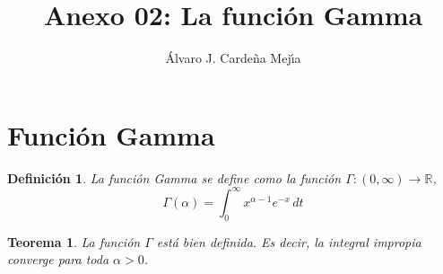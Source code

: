 \documentclass[a4paper,11pt]{article}
\title{Anexo 02: La funci\'on Gamma}
\author{\'Alvaro J. Carde\~na Mej\'{\i}a}
\theoremstyle{teoremas}
\newtheorem{teorema}{Teorema}[section]
\theoremstyle{ejemplos}
\theoremstyle{definiciones}
\theoremstyle{lemas}
\newtheorem*{definicion}{Definici\'on}
\begin{document}
\maketitle

\section{Funci\'on Gamma}

\begin{definicion}
 La \textit{funci\'on Gamma} se define como la funci\'on $\Gamma: (0,\infty) \to \mathbb{R}$,
 \begin{equation*}
  \Gamma(\alpha) = \int_0^{\infty} x^{\alpha - 1} e^{-x} \, dt
 \end{equation*}
\end{definicion}


\begin{teorema} \label{Teorema:GammaDefinida}
 La funci\'on $\Gamma$ est\'a bien definida. Es decir, la integral impropia converge para toda $\alpha > 0$.
\end{teorema}
\end{document}
